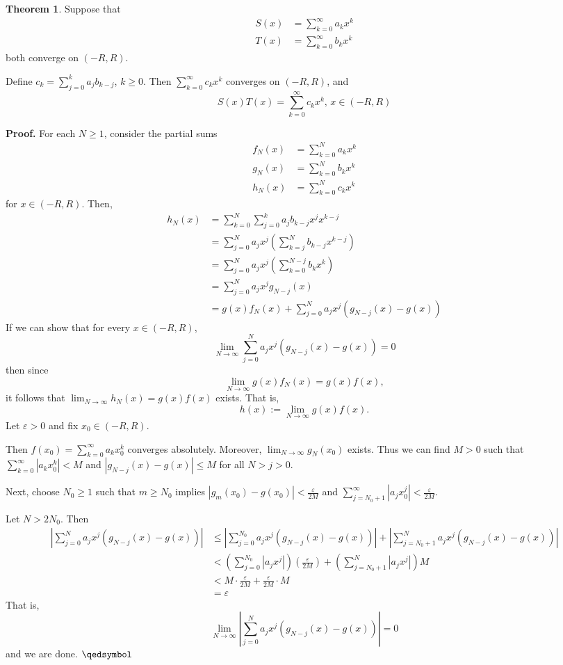 \documentclass[11pt]{article}
\theoremstyle{definition}
\newtheorem{thm}{Theorem}[section]
\begin{document}
\begin{thm}
Suppose that 
\begin{align*}
S(x) & = \sum_{k=0}^\infty a_k x^k \\
T(x) & = \sum_{k=0}^\infty b_k x^k
\end{align*}
both converge on $(-R, R)$.

Define $c_k = \sum_{j=0}^k a_j b_{k-j}$, $k \geq 0$. Then $\sum_{k=0}^\infty c_k x^k$ converges on $(-R, R)$, and
$$S(x)T(x) = \sum_{k=0}^\infty c_k x^k, \, x \in (-R, R)$$
\end{thm}
\textbf{Proof.} 
For each $N \geq 1$, consider the partial sums
\begin{align*}
f_N(x) & = \sum_{k=0}^N a_k x^k \\
g_N(x) & = \sum_{k=0}^N b_k x^k \\
h_N(x) & = \sum_{k=0}^N c_k x^k
\end{align*}
for $x \in (-R, R)$. Then,
\begin{align*}
h_N(x) & = \sum_{k=0}^N \sum_{j=0}^k a_j b_{k-j} x^j x^{k-j} \\
& = \sum_{j=0}^N a_j x^j \left( \sum_{k=j}^N b_{k-j} x^{k-j} \right) \\
& = \sum_{j=0}^N a_j x^j \left( \sum_{k=0}^{N-j} b_k x^k \right) \\
& = \sum_{j=0}^N a_j x^j g_{N-j}(x) \\
& = g(x) f_N(x) + \sum_{j=0}^N a_j x^j \left( g_{N-j}(x) - g(x) \right)
\end{align*}
If we can show that for every $x \in (-R, R)$,
$$\lim_{N\to\infty} \sum_{j=0}^N a_j x^j \left(g_{N-j}(x) - g(x)\right) = 0$$
then since
$$\lim_{N\to\infty} g(x) f_N(x) = g(x) f(x),$$
it follows that $\lim_{N\to\infty} h_N(x) = g(x)f(x)$ exists. That is,
$$h(x) := \lim_{N\to\infty} g(x)f(x).$$
Let $\varepsilon > 0$ and fix $x_0 \in (-R, R)$.

Then $f(x_0) = \sum_{k=0}^\infty a_k x_0^k$ converges absolutely. Moreover, $\lim_{N\to\infty} g_N(x_0)$ exists. Thus we can find $M > 0$ such that $\sum_{k=0}^\infty |a_k x_0^k| < M$ and $|g_{N-j}(x) - g(x)| \leq M$ for all $N > j > 0$. 

Next, choose $N_0 \geq 1$ such that $m \geq N_0$ implies $|g_m(x_0) - g(x_0)| < \frac{\varepsilon}{2M}$ and $\sum_{j=N_0+1}^\infty |a_j x_0^j| < \frac{\varepsilon}{2M}$. 

Let $N > 2N_0$. Then
\begin{align*}
\left| \sum_{j=0}^N a_j x^j \left( g_{N-j}(x) - g(x) \right) \right| 
& \leq \left| \sum_{j=0}^{N_0} a_j x^j \left(g_{N-j}(x) - g(x)\right) \right| + \left| \sum_{j=N_0+1}^N a_j x^j \left(g_{N-j}(x) - g(x)\right) \right| \\
& < \left(\sum_{j=0}^{N_0} |a_j x^j| \right) \left( \frac{\varepsilon}{2M} \right) + \left( \sum_{j=N_0+1}^N |a_j x^j| \right)M \\
& < M \cdot \frac{\varepsilon}{2M} + \frac{\varepsilon}{2M} \cdot M \\
& = \varepsilon
\end{align*}
That is,
$$\lim_{N\to\infty} \left| \sum_{j=0}^N a_j x^j \left(g_{N-j}(x) - g(x) \right) \right| = 0$$
and we are done. $\qedsymbol$
\end{document}
